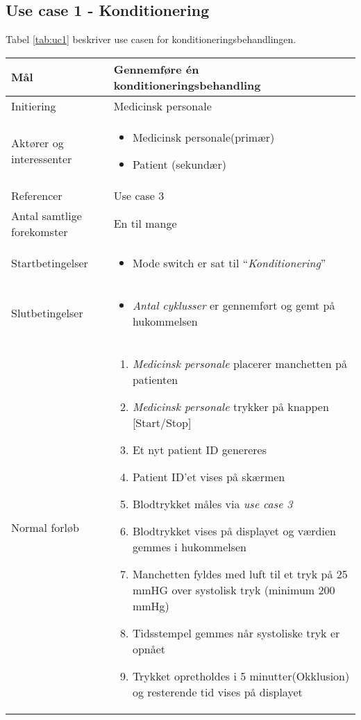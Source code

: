 \subsection{Use case 1 - Konditionering}
Tabel \ref{tab:uc1} beskriver use casen for konditioneringsbehandlingen. 
\begin{center}
		\begin{longtable}{ | p{} | p{}| } 
			\hline
			Mål & Gennemføre én konditioneringsbehandling  \\ 
			\hline
			Initiering &  Medicinsk personale\\
			\hline
			Aktører og interessenter & 
			\begin{itemize}
				\item Medicinsk personale(primær)
				\item Patient (sekundær)
			\end{itemize} \\ 
			\hline
			Referencer & Use case 3 \\ 
			\hline
			Antal samtlige forekomster & En til mange\\ 
			\hline	
			Startbetingelser & 
			\begin{itemize}
				\setlength\itemsep{0cm} %
				\item Mode switch er sat til “\textit{Konditionering}”
			\end{itemize} \\ 
			\hline
			Slutbetingelser & 
			\begin{itemize}
				\setlength\itemsep{0cm} %
				\item \textit{Antal cyklusser} er gennemført og gemt på hukommelsen
			\end{itemize} \\ 
			\hline
			Normal forløb & \begin{enumerate}
				\setlength\itemsep{0cm} %
				\item \textit{Medicinsk personale} placerer manchetten på patienten
				\item \textit{Medicinsk personale} trykker på knappen [Start/Stop]
				\subitem[Undtagelse \#1]
				\item Et nyt patient ID genereres
				\subitem[Undtagelse \#2] 
				\item Patient ID’et vises på skærmen
				\item Blodtrykket måles via \textit{use case 3}
				\item Blodtrykket vises på displayet og værdien gemmes i hukommelsen
				\item Manchetten fyldes med luft til et tryk på 25 mmHG over systolisk tryk (minimum 200 mmHg)				
				\item Tidsstempel gemmes når systoliske tryk er opnået
				\item Trykket opretholdes i 5 minutter(Okklusion) og resterende tid vises på displayet
				

\end{enumerate}
\end{longtable}
\end{center}

